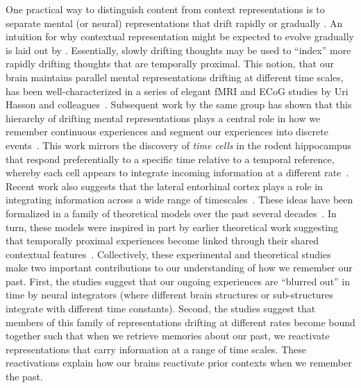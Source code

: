 \documentclass{article}
\begin{document}
One practical way to distinguish content from context representations is to separate mental (or neural) representations that drift rapidly \citep[content;][]{PolyEtal05, MannEtal12} or gradually \citep[context;][]{PolyEtal05, MannEtal11, HowaEtal12, LohnEtal18, LongKaha18, FolkEtal18}.  An intuition for why contextual representation might be expected to evolve gradually is laid out by \cite{PolyKaha08}.  Essentially, slowly drifting thoughts may be used to ``index'' more rapidly drifting thoughts that are temporally proximal.  This notion, that our brain maintains parallel mental representations drifting at different time scales, has been well-characterized in a series of elegant fMRI and ECoG studies by Uri Hasson and colleagues~\citep{HassEtal08, LernEtal11, HoneEtal12, AlyEtal18}.  Subsequent work by the same group has shown that this hierarchy of drifting mental representations plays a central role in how we remember continuous experiences and segment our experiences into discrete events~\citep{BaldEtal17}. This work mirrors the discovery of \textit{time cells} in the rodent hippocampus that respond preferentially to a specific time relative to a temporal reference, whereby each cell appears to integrate incoming information at a different rate~\citep{PastEtal08, MacDEtal11}. Recent work also suggests that the lateral entorhinal cortex plays a role in integrating information across a wide range of timescales~\citep{TsaoEtal18}.  These ideas have been formalized in a family of theoretical models over the past several decades~\citep{HowaKaha02, DianEtal07, SedeEtal08, PolyEtal09, ShanEtal09, ShanHowa10, ShanHowa12, HowaEtal14}.  In turn, these models were inspired in part by earlier theoretical work suggesting that temporally proximal experiences become linked through their shared contextual features~\citep{Este55a,AtkiShif68}.  Collectively, these experimental and theoretical studies make two important contributions to our understanding of how we remember our past.  First, the studies suggest that our ongoing experiences are ``blurred out'' in time by neural integrators (where different brain structures or sub-structures integrate with different time constants).  Second, the studies suggest that members of this family of representations drifting at different rates become bound together such that when we retrieve memories about our past, we reactivate representations that carry information at a range of time scales.  These reactivations explain how our brains reactivate prior contexts when we remember the past.
\end{document}
